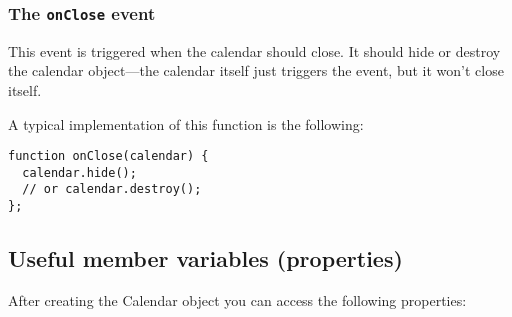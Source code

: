 \documentclass[a4paper,twoside,10pt]{dynadoc}
\begin{document}
\subsubsection*{The \texttt{onClose} event}\label{sec:Calendar.onClose}

This event is triggered when the calendar should close.  It should hide or
destroy the calendar object---the calendar itself just triggers the event, but
it won't close itself.

A typical implementation of this function is the following:

\begin{verbatim}
function onClose(calendar) {
  calendar.hide();
  // or calendar.destroy();
};
\end{verbatim}

\subsection{Useful member variables (properties)}\label{sec:Calendar.props}

After creating the Calendar object you can access the following properties:
\end{document}
